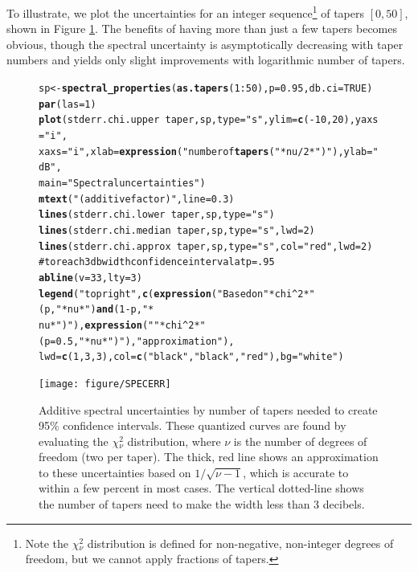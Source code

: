 \documentclass[10pt]{article}\usepackage{graphicx, color}
\makeatletter
\newcommand{\hlfunctioncall}[1]{\textcolor[rgb]{0.501960784313725,0,0.329411764705882}{\textbf{#1}}}%
\newcommand{\hlstring}[1]{\textcolor[rgb]{0.6,0.6,1}{#1}}%
\newcommand{\hlcomment}[1]{\textcolor[rgb]{0.180392156862745,0.6,0.341176470588235}{#1}}%
\newenvironment{kframe}{%
 \def\at@end@of@kframe{}%
 \ifinner\ifhmode%
  \def\at@end@of@kframe{\end{minipage}}%
  \begin{minipage}{\columnwidth}%
 \fi\fi%
 \def\FrameCommand##1{\hskip\@totalleftmargin \hskip-\fboxsep
 \colorbox{shadecolor}{##1}\hskip-\fboxsep
     \hskip-\linewidth \hskip-\@totalleftmargin \hskip\columnwidth}%
 \MakeFramed {\advance\hsize-\width
   \@totalleftmargin\z@ \linewidth\hsize
   \@setminipage}}%
 {\par\unskip\endMakeFramed%
 \at@end@of@kframe}
\newenvironment{knitrout}{}{} %
\makeatother
\begin{document}
To illustrate, we 
plot the uncertainties for an integer sequence\footnote{
Note the $\chi{}_{\nu}^2$ distribution is defined for non-negative,
non-integer degrees of freedom, but we cannot apply
fractions of tapers.} of tapers $[0, 50]$, shown in
Figure \ref{fig:psderr}.  The benefits of having more than just
a few tapers becomes obvious, though the spectral uncertainty
is asymptotically decreasing with taper numbers and yields
only slight improvements with logarithmic number of tapers.

\begin{figure}[htb!]
\begin{center}
\begin{knitrout}
\color{fgcolor}\begin{kframe}
\begin{alltt}
sp <- \hlfunctioncall{spectral_properties}(\hlfunctioncall{as.tapers}(1:50), p = 0.95, db.ci = TRUE)
\hlfunctioncall{par}(las = 1)
\hlfunctioncall{plot}(stderr.chi.upper ~ taper, sp, type = \hlstring{"s"}, ylim = \hlfunctioncall{c}(-10, 20), yaxs = \hlstring{"i"}, 
    xaxs = \hlstring{"i"}, xlab = \hlfunctioncall{expression}(\hlstring{"number of \hlfunctioncall{tapers} ("} * nu/2 * \hlstring{")"}), ylab = \hlstring{"dB"}, 
    main = \hlstring{"Spectral uncertainties"})
\hlfunctioncall{mtext}(\hlstring{"(additive factor)"}, line = 0.3)
\hlfunctioncall{lines}(stderr.chi.lower ~ taper, sp, type = \hlstring{"s"})
\hlfunctioncall{lines}(stderr.chi.median ~ taper, sp, type = \hlstring{"s"}, lwd = 2)
\hlfunctioncall{lines}(stderr.chi.approx ~ taper, sp, type = \hlstring{"s"}, col = \hlstring{"red"}, lwd = 2)
\hlcomment{# to reach 3 db width confidence interval at p=.95}
\hlfunctioncall{abline}(v = 33, lty = 3)
\hlfunctioncall{legend}(\hlstring{"topright"}, \hlfunctioncall{c}(\hlfunctioncall{expression}(\hlstring{"Based on "} * chi^2 * \hlstring{"(p,"} * nu * \hlstring{") \hlfunctioncall{and} (1-p,"} * 
    nu * \hlstring{")"}), \hlfunctioncall{expression}(\hlstring{""} * chi^2 * \hlstring{"(p=0.5,"} * nu * \hlstring{")"}), \hlstring{"approximation"}), 
    lwd = \hlfunctioncall{c}(1, 3, 3), col = \hlfunctioncall{c}(\hlstring{"black"}, \hlstring{"black"}, \hlstring{"red"}), bg = \hlstring{"white"})
\end{alltt}
\end{kframe}
\texttt{[image: figure/SPECERR]} 

\end{knitrout}

\caption{Additive spectral uncertainties by number of tapers
needed to create 95\% confidence intervals.
These quantized curves are found
by evaluating the $\chi{}_{\nu}^2$ distribution, where $\nu$ is
the number of degrees of freedom (two per taper).  
The thick, red line shows an approximation to these uncertainties
based on $1/\sqrt{\nu-1}$, which is accurate to within a few percent in most cases.
The vertical dotted-line shows the number of tapers need to make
the width less than 3 decibels. 
}
\label{fig:psderr}
\end{center}
\end{figure}
\end{document}
